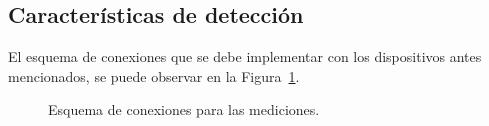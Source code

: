   \subsection{Características de detección}

    El esquema de conexiones que se debe implementar con los dispositivos antes mencionados, se puede observar en
    la Figura~\ref{fig:EsquemaConexiones}.

    \begin{figure}[H]
      \centering
      \caption{Esquema de conexiones para las mediciones.}
      \label{fig:EsquemaConexiones}
    \end{figure}


